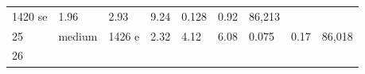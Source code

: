 \documentclass[
  10pt, ]{article}
\begin{document}
\begin{longtable}[]{@{}lllllllll@{}}
\begin{minipage}[t]{0.08\columnwidth}
1420 se\strut
\end{minipage} & \begin{minipage}[t]{0.08\columnwidth}\raggedright
1.96\strut
\end{minipage} & \begin{minipage}[t]{0.08\columnwidth}\raggedright
2.93\strut
\end{minipage} & \begin{minipage}[t]{0.08\columnwidth}\raggedright
9.24\strut
\end{minipage} & \begin{minipage}[t]{0.08\columnwidth}\raggedright
0.128\strut
\end{minipage} & \begin{minipage}[t]{0.08\columnwidth}\raggedright
0.92\strut
\end{minipage} & \begin{minipage}[t]{0.08\columnwidth}\raggedright
86,213\strut
\end{minipage}\tabularnewline
\begin{minipage}[t]{0.08\columnwidth}\raggedright
25\strut
\end{minipage} & \begin{minipage}[t]{0.08\columnwidth}\raggedright
medium\strut
\end{minipage} & \begin{minipage}[t]{0.08\columnwidth}\raggedright
1426 e\strut
\end{minipage} & \begin{minipage}[t]{0.08\columnwidth}\raggedright
2.32\strut
\end{minipage} & \begin{minipage}[t]{0.08\columnwidth}\raggedright
4.12\strut
\end{minipage} & \begin{minipage}[t]{0.08\columnwidth}\raggedright
6.08\strut
\end{minipage} & \begin{minipage}[t]{0.08\columnwidth}\raggedright
0.075\strut
\end{minipage} & \begin{minipage}[t]{0.08\columnwidth}\raggedright
0.17\strut
\end{minipage} & \begin{minipage}[t]{0.08\columnwidth}\raggedright
86,018\strut
\end{minipage}\tabularnewline
\begin{minipage}[t]{0.08\columnwidth}\raggedright
26\strut
\end{minipage} & \begin{minipage}[t]{0.08\columnwidth}\raggedright

\end{minipage}
\end{longtable}
\end{document}

